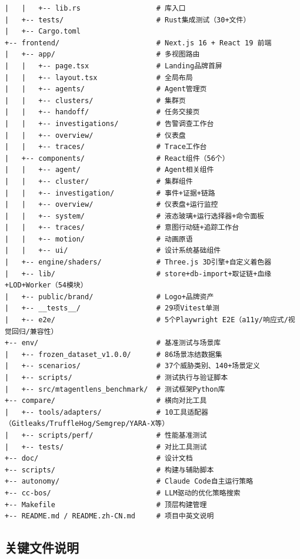 \documentclass[a4paper]{ctexart}
\makeatletter
\renewcommand{\_}{%
  \ifmmode
    \nfss@text{\textunderscore}%
  \else
    \textunderscore\discretionary{}{}{}%
  \fi}
\makeatother
\begin{document}
\begin{lstlisting}
|   |   +-- lib.rs                  # 库入口
|   +-- tests/                      # Rust集成测试（30+文件）
|   +-- Cargo.toml
+-- frontend/                       # Next.js 16 + React 19 前端
|   +-- app/                        # 多视图路由
|   |   +-- page.tsx                # Landing品牌首屏
|   |   +-- layout.tsx              # 全局布局
|   |   +-- agents/                 # Agent管理页
|   |   +-- clusters/               # 集群页
|   |   +-- handoff/                # 任务交接页
|   |   +-- investigations/         # 告警调查工作台
|   |   +-- overview/               # 仪表盘
|   |   +-- traces/                 # Trace工作台
|   +-- components/                 # React组件（56个）
|   |   +-- agent/                  # Agent相关组件
|   |   +-- cluster/                # 集群组件
|   |   +-- investigation/          # 事件+证据+链路
|   |   +-- overview/               # 仪表盘+运行监控
|   |   +-- system/                 # 液态玻璃+运行选择器+命令面板
|   |   +-- traces/                 # 意图行动链+追踪工作台
|   |   +-- motion/                 # 动画原语
|   |   +-- ui/                     # 设计系统基础组件
|   +-- engine/shaders/             # Three.js 3D引擎+自定义着色器
|   +-- lib/                        # store+db-import+取证链+血缘+LOD+Worker（54模块）
|   +-- public/brand/               # Logo+品牌资产
|   +-- __tests__/                  # 29项Vitest单测
|   +-- e2e/                        # 5个Playwright E2E（a11y/响应式/视觉回归/兼容性）
+-- env/                            # 基准测试与场景库
|   +-- frozen_dataset_v1.0.0/      # 86场景冻结数据集
|   +-- scenarios/                  # 37个威胁类别、140+场景定义
|   +-- scripts/                    # 测试执行与验证脚本
|   +-- src/mtagentlens_benchmark/  # 测试框架Python库
+-- compare/                        # 横向对比工具
|   +-- tools/adapters/             # 10工具适配器（Gitleaks/TruffleHog/Semgrep/YARA-X等）
|   +-- scripts/perf/               # 性能基准测试
|   +-- tests/                      # 对比工具测试
+-- doc/                            # 设计文档
+-- scripts/                        # 构建与辅助脚本
+-- autonomy/                       # Claude Code自主运行策略
+-- cc-bos/                         # LLM驱动的优化策略搜索
+-- Makefile                        # 顶层构建管理
+-- README.md / README.zh-CN.md     # 项目中英文说明
\end{lstlisting}


\subsection{关键文件说明}
\end{document}
